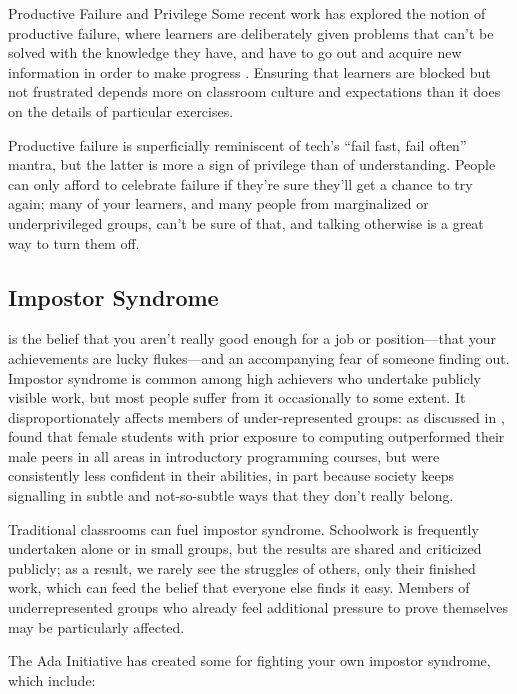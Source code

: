 \begin{aside}{Productive Failure and Privilege}
  Some recent work has explored the notion of productive failure, where
  learners are deliberately given problems that can't be solved with the
  knowledge they have, and have to go out and acquire new information in
  order to make progress \cite{Kapu2016}. Ensuring that learners are
  blocked but not frustrated depends more on classroom culture and
  expectations than it does on the details of particular exercises.

  Productive failure is superficially reminiscent of tech's ``fail fast,
  fail often'' mantra, but the latter is more a sign of privilege than of
  understanding. People can only afford to celebrate failure if they're
  sure they'll get a chance to try again; many of your learners, and
  many people from marginalized or underprivileged groups, can't be sure
  of that, and talking otherwise is a great way to turn them off.
\end{aside}

\subsection*{Impostor Syndrome}

 is the belief that
you aren't really good enough for a job or position---that your
achievements are lucky flukes---and an accompanying fear of someone
finding out. Impostor syndrome is common among high achievers who
undertake publicly visible work, but most people suffer from it
occasionally to some extent. It disproportionately affects members of
under-represented groups: as discussed in ,
\cite{Wilc2018} found that female students with prior exposure to
computing outperformed their male peers in all areas in introductory
programming courses, but were consistently less confident in their
abilities, in part because society keeps signalling in subtle and
not-so-subtle ways that they don't really belong.

Traditional classrooms can fuel impostor syndrome. Schoolwork is
frequently undertaken alone or in small groups, but the results are
shared and criticized publicly; as a result, we rarely see the struggles
of others, only their finished work, which can feed the belief that
everyone else finds it easy. Members of underrepresented groups who
already feel additional pressure to prove themselves may be particularly
affected.

The Ada Initiative has created some  for
fighting your own impostor syndrome, which include:

